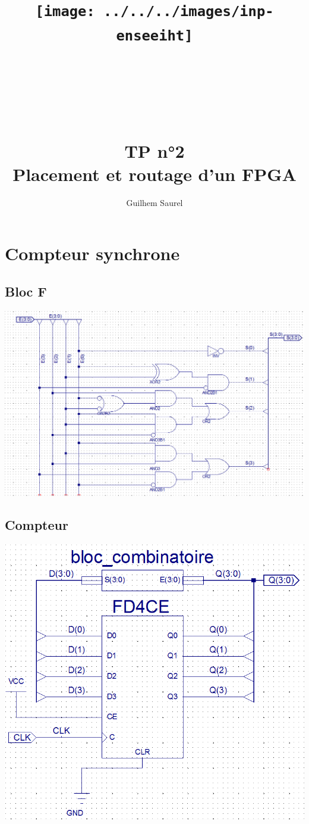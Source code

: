 \documentclass{article}
\title{\texttt{[image: ../../../images/inp-enseeiht]} \\ ~ \\ ~ \\ ~ \\ ~ \\ TP n°2 \\ Placement et routage d’un FPGA}
\author{Guilhem Saurel}
\date{\oldstylenums{\today}}
\begin{document}
\begin{titlepage}
    \setcounter{page}{0}
    \maketitle
    \thispagestyle{empty}
\tableofcontents
\end{titlepage}


\section{Compteur synchrone}
\subsection{Bloc F}
\includegraphics[width=\linewidth]{bloc_combinatoire}
\subsection{Compteur}
\includegraphics[width=\linewidth]{compteur_decade}
\end{document}
